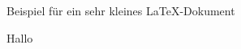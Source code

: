 \documentclass{article}
\begin{document}
Beispiel f\"ur ein sehr \tiny{kleines} \normalsize \LaTeX-Dokument

Hallo
\end{document}
